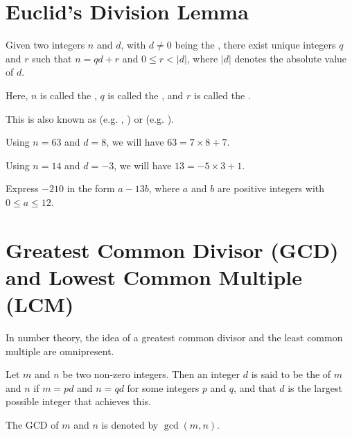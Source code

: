 \section{Euclid's Division Lemma}
\begin{lemma}\label{lemma-euclid-division}
    Given two integers $n$ and $d$, with $d \neq 0$ being the , there exist unique integers $q$ and $r$ such that $n = qd + r$ and $0 \leq r < |d|$, where $|d|$ denotes the absolute value of $d$.

    Here, $n$ is called the , $q$ is called the , and $r$ is called the .
\end{lemma}
\begin{remark}
    This is also known as  (e.g. \cite[p.~4]{dummit_foote_2004}, \cite[p.~3]{gallian_2016}) or  (e.g. \cite[\S 21]{clark_1984}).
\end{remark}

\begin{example}
    Using $n = 63$ and $d = 8$, we will have $63 = 7\times8 + 7$.
\end{example}

\begin{example}
    Using $n = 14$ and $d = -3$, we will have $13 = -5\times3 + 1$.
\end{example}

\begin{exercise}
    Express $-210$ in the form $a-13b$, where $a$ and $b$ are positive integers with $0 \leq a \leq 12$.
\end{exercise}

\section{Greatest Common Divisor (GCD) and Lowest Common Multiple (LCM)}
In number theory, the idea of a greatest common divisor and the least common multiple are omnipresent.

\begin{definition}
    Let $m$ and $n$ be two non-zero integers. Then an integer $d$ is said to be the  of $m$ and $n$ if $m = pd$ and $n = qd$ for some integers $p$ and $q$, and that $d$ is the largest possible integer that achieves this.

    The GCD of $m$ and $n$ is denoted by $\gcd(m, n)$.
\end{definition}

